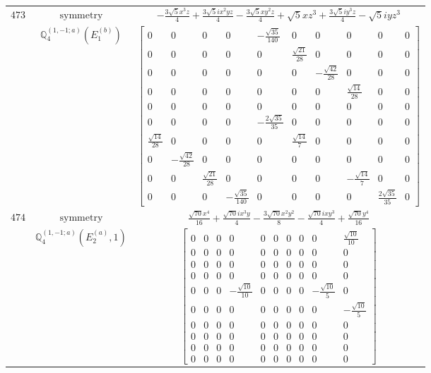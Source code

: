 \documentclass[fleqn,8pt,landscape]{jsarticle}
\begin{document}
\begin{longtable}{ccc}
$ 473 $ & $ \text{symmetry} $ & $ - \frac{3 \sqrt{5} x^{3} z}{4} + \frac{3 \sqrt{5} i x^{2} y z}{4} - \frac{3 \sqrt{5} x y^{2} z}{4} + \sqrt{5} x z^{3} + \frac{3 \sqrt{5} i y^{3} z}{4} - \sqrt{5} i y z^{3} $ \\
$  $ & $ \mathbb{Q}_{4}^{(1,-1;a)}(E_{1}^{(b)}) $ & $ \begin{bmatrix} 0 & 0 & 0 & 0 & - \frac{\sqrt{35}}{140} & 0 & 0 & 0 & 0 & 0 \\ 0 & 0 & 0 & 0 & 0 & \frac{\sqrt{21}}{28} & 0 & 0 & 0 & 0 \\ 0 & 0 & 0 & 0 & 0 & 0 & - \frac{\sqrt{42}}{28} & 0 & 0 & 0 \\ 0 & 0 & 0 & 0 & 0 & 0 & 0 & \frac{\sqrt{14}}{28} & 0 & 0 \\ 0 & 0 & 0 & 0 & 0 & 0 & 0 & 0 & 0 & 0 \\ 0 & 0 & 0 & 0 & - \frac{2 \sqrt{35}}{35} & 0 & 0 & 0 & 0 & 0 \\ \frac{\sqrt{14}}{28} & 0 & 0 & 0 & 0 & \frac{\sqrt{14}}{7} & 0 & 0 & 0 & 0 \\ 0 & - \frac{\sqrt{42}}{28} & 0 & 0 & 0 & 0 & 0 & 0 & 0 & 0 \\ 0 & 0 & \frac{\sqrt{21}}{28} & 0 & 0 & 0 & 0 & - \frac{\sqrt{14}}{7} & 0 & 0 \\ 0 & 0 & 0 & - \frac{\sqrt{35}}{140} & 0 & 0 & 0 & 0 & \frac{2 \sqrt{35}}{35} & 0 \end{bmatrix} $ \\ \hline
$ 474 $ & $ \text{symmetry} $ & $ \frac{\sqrt{70} x^{4}}{16} + \frac{\sqrt{70} i x^{3} y}{4} - \frac{3 \sqrt{70} x^{2} y^{2}}{8} - \frac{\sqrt{70} i x y^{3}}{4} + \frac{\sqrt{70} y^{4}}{16} $ \\
$  $ & $ \mathbb{Q}_{4}^{(1,-1;a)}(E_{2}^{(a)},1) $ & $ \begin{bmatrix} 0 & 0 & 0 & 0 & 0 & 0 & 0 & 0 & 0 & \frac{\sqrt{10}}{10} \\ 0 & 0 & 0 & 0 & 0 & 0 & 0 & 0 & 0 & 0 \\ 0 & 0 & 0 & 0 & 0 & 0 & 0 & 0 & 0 & 0 \\ 0 & 0 & 0 & 0 & 0 & 0 & 0 & 0 & 0 & 0 \\ 0 & 0 & 0 & - \frac{\sqrt{10}}{10} & 0 & 0 & 0 & 0 & - \frac{\sqrt{10}}{5} & 0 \\ 0 & 0 & 0 & 0 & 0 & 0 & 0 & 0 & 0 & - \frac{\sqrt{10}}{5} \\ 0 & 0 & 0 & 0 & 0 & 0 & 0 & 0 & 0 & 0 \\ 0 & 0 & 0 & 0 & 0 & 0 & 0 & 0 & 0 & 0 \\ 0 & 0 & 0 & 0 & 0 & 0 & 0 & 0 & 0 & 0 \\ 0 & 0 & 0 & 0 & 0 & 0 & 0 & 0 & 0 & 0 \end{bmatrix} $ \\ \hline

\end{longtable}
\end{document}
